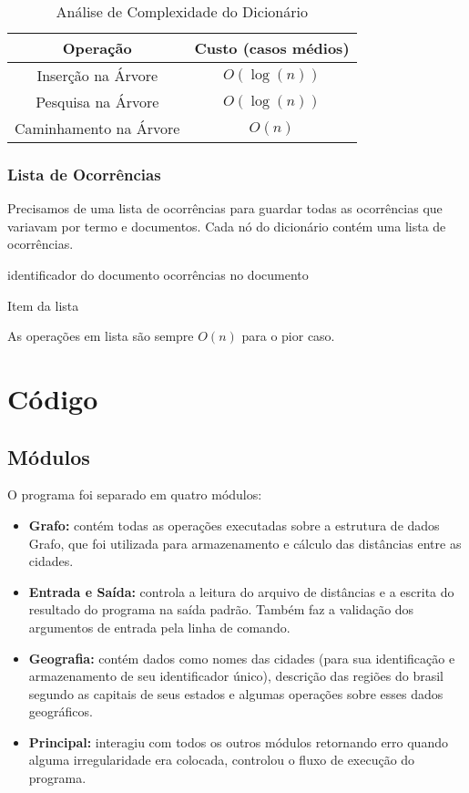 \documentclass[12pt]{article}
\begin{document}
\begin{table}[ht]
  \caption{Análise de Complexidade do Dicionário}
  \centering
  \begin{footnotesize}
  \begin{tabular}{c c}
  \hline\hline
  Operação & Custo (casos médios) \\
  \hline
  Inserção na Árvore & $O(\log(n))$ \\
  Pesquisa na Árvore & $O(\log(n))$ \\
  Caminhamento na Árvore & $O(n)$ \\
  \hline
  \end{tabular}
  \end{footnotesize}
\end{table}

\subsubsection{Lista de Ocorrências}

Precisamos de uma lista de ocorrências para guardar todas as ocorrências que
variavam por termo e documentos. Cada nó do dicionário contém uma lista de
ocorrências.

\begin{algorithm}[h!]
\begin{footnotesize}
	identificador do documento\;
	ocorrências no documento\;
\caption{Item da lista}
\end{footnotesize}
\end{algorithm}

As operações em lista são sempre $O(n)$ para o pior caso.

\section{Código}

\subsection{Módulos}
O programa foi separado em quatro módulos:
\begin{itemize}
\item \textbf{Grafo:} contém todas as operações executadas sobre a 
estrutura de dados Grafo, que foi utilizada para armazenamento e cálculo
das distâncias entre as cidades.
\item \textbf{Entrada e Saída:} controla a leitura do arquivo de distâncias
e a escrita do resultado do programa na saída padrão. Também faz a validação dos 
argumentos de entrada pela linha de comando.
\item \textbf{Geografia:} contém dados como nomes das cidades (para sua identificação
e armazenamento de seu identificador único), descrição das regiões do brasil
segundo as capitais de seus estados e algumas operações sobre esses dados geográficos.
\item \textbf{Principal:} interagiu com todos os outros módulos retornando erro
quando alguma irregularidade era colocada, controlou o fluxo de execução do
programa.
\end{itemize}
\end{document}
